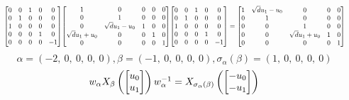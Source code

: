 \documentclass[11pt]{article}
\theoremstyle{definition}
\begin{document}
\[
\scaletoalign{\textwidth}{{\left[\begin{matrix}0 & 0 & 1 & 0 & 0\\0 & 1 & 0 & 0 & 0\\1 & 0 & 0 & 0 & 0\\0 & 0 & 0 & 1 & 0\\0 & 0 & 0 & 0 & -1\end{matrix}\right]} {\left[\begin{matrix}1 & 0 & 0 & 0 & 0\\0 & 1 & 0 & 0 & 0\\0 & \sqrt{d} u_{1} - u_{0} & 1 & 0 & 0\\\sqrt{d} u_{1} + u_{0} & 0 & 0 & 1 & 0\\0 & 0 & 0 & 0 & 1\end{matrix}\right]} {\left[\begin{matrix}0 & 0 & 1 & 0 & 0\\0 & 1 & 0 & 0 & 0\\1 & 0 & 0 & 0 & 0\\0 & 0 & 0 & 1 & 0\\0 & 0 & 0 & 0 & -1\end{matrix}\right]} = {\left[\begin{matrix}1 & \sqrt{d} u_{1} - u_{0} & 0 & 0 & 0\\0 & 1 & 0 & 0 & 0\\0 & 0 & 1 & 0 & 0\\0 & 0 & \sqrt{d} u_{1} + u_{0} & 1 & 0\\0 & 0 & 0 & 0 & 1\end{matrix}\right]}}
\]
\[
\alpha = \left( -2, \  0, \  0, \  0, \  0\right), \beta = \left( -1, \  0, \  0, \  0, \  0\right), \sigma_{\alpha}(\beta) = \left( 1, \  0, \  0, \  0, \  0\right)
\]
\[
\scaletoalign{\textwidth}{w_{\alpha} X_{\beta}\left(\left[\begin{matrix}u_{0}\\u_{1}\end{matrix}\right]\right) w_{\alpha}^{-1} = X_{\sigma_{\alpha}\left(\beta\right)}\left(\left[\begin{matrix}- u_{0}\\- u_{1}\end{matrix}\right]\right)}
\]
\end{document}
